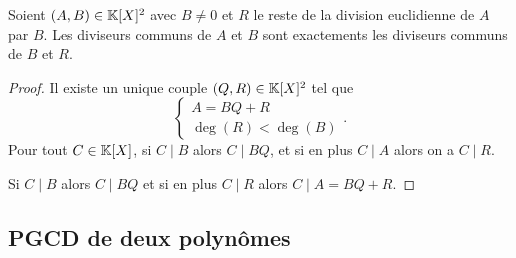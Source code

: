 \begin{prop}
  Soient $(A,B)\in\mathbb{K}[X]^2$ avec $B \neq 0$ et $R$ le reste de la division euclidienne de $A$ par $B$. Les diviseurs communs de $A$ et $B$ sont exactements les diviseurs communs de $B$ et $R$.
\end{prop}
\begin{proof}
  Il existe un unique couple $(Q,R) \in \mathbb{K}[X]^2$ tel que 
  \begin{equation}
    \begin{cases} 
      A=BQ+R \\ \deg(R) < \deg(B) 
    \end{cases}.
  \end{equation}
  Pour tout $C \in \mathbb{K}[X]$, si  $C\mid{}B$ alors $C\mid{}BQ$, et si en plus $C\mid{}A$ alors on a $C\mid{}R$.
  
  Si $C\mid{}B$ alors $C\mid{}BQ$ et si en plus $C\mid{}R$ alors $C\mid{}A=BQ+R$.
\end{proof}

\subsection{PGCD de deux polynômes}

